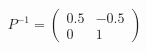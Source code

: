 \documentclass[preview]{standalone}
\begin{document}
\begin{align*}
P^{-1} = \begin{pmatrix} 0.5 & -0.5 \\ 0 & 1 \end{pmatrix}
\end{align*}
\end{document}
